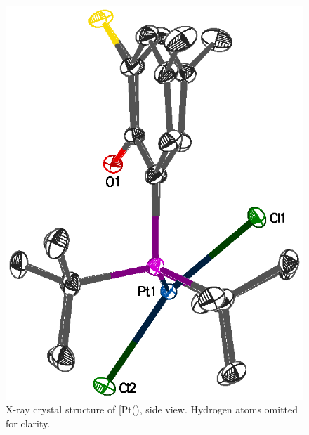 \begin{figure}[htbp]
\begin{center}
\vspace{0.5cm}
\includegraphics[scale=0.8]{../Figures/Crystalthixantphosplatinumdichlorideside.eps}
\caption[X-ray crystal structure of [Pt(\tButhixantphos)\ce{Cl2]}, side view]{X-ray crystal structure of [Pt(\tButhixantphos)\ce{Cl2]}, side view. Hydrogen atoms omitted for clarity.}
\label{crystalthixantphosplatinumdichlorideside}
\end{center}
\end{figure}
\vspace{0.2cm}

